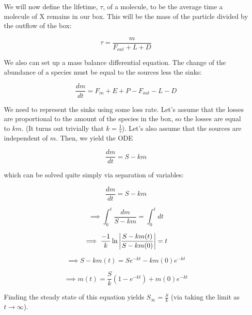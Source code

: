 \documentclass{article}
\begin{document}
We will now define the lifetime, $\tau$, of a molecule, to be the average time a molecule of X remains in our box. 
This will be the mass of the particle divided by the outflow of the box:

\begin{equation}
    \tau = \frac{m}{F_{out}+L+D}    
\end{equation}

We also can set up a mass balance differential equation. The change of the abundance of a species must be equal to the sources less the sinks:

\begin{equation}
    \frac{dm}{dt} = F_{in} + E + P - F_{out} - L - D
\end{equation}

We need to represent the sinks using some loss rate. Let's assume that the losses are proportional to the amount of the species in the box, so the losses are
equal to $km$. (It turns out trivially that $k = \frac{1}{\tau}$). Let's also assume that the sources are independent of $m$. Then, we yield the ODE

\begin{equation}
    \frac{dm}{dt} = S - km
\end{equation}

which can be solved quite simply via separation of variables:

$$
    \frac{dm}{dt} = S - km
$$

$$
    \implies \int_0^t \frac{dm}{S-km} = \int_0^t dt
$$

$$
    \implies \frac{-1}{k} \ln{\abs{\frac{S-km(t)}{S-km(0)}}} = t
$$

$$
    \implies S - km(t) = Se^{-kt} - km(0)e^{-kt}
$$

\begin{equation}
    \implies m(t) = \frac{S}{k}(1-e^{-kt}) + m(0)e^{-kt}
\end{equation}

Finding the steady state of this equation yields $S_\infty = \frac{S}{k}$ (via taking the limit as $t \rightarrow \infty$).
\end{document}
